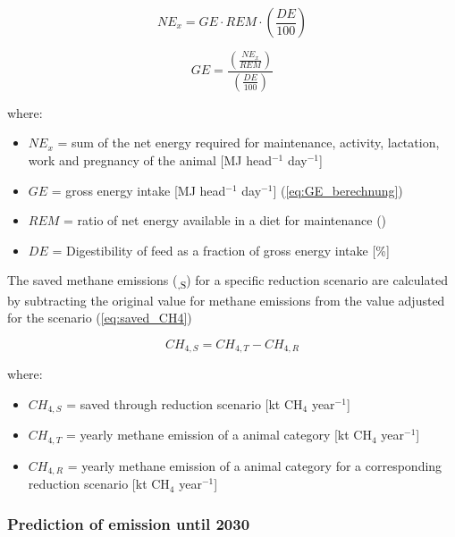 \begin{equation}
	NE_x = GE \cdot REM \cdot \left( \frac{DE}{100}\right)
	\label{eq:NE_x_calc} 
\end{equation}

\begin{equation}
	GE = \frac{\left( \frac{NE_x}{REM}\right) }{\left( \frac{DE}{100}\right)}
	\label{eq:GE_adjusted_calc}
\end{equation}

\noindent where:
\begin{itemize}
	\item $NE_x$ = sum of the net energy required for maintenance, activity, lactation, work and pregnancy of the animal [MJ head$^{-1}$ day$^{-1}$]
	\item $GE$ = gross energy intake [MJ head$^{-1}$ day$^{-1}$] (\cref{eq:GE_berechnung})
	\item $REM$ = ratio of net energy available in a diet for maintenance ()
	\item $DE$ = Digestibility of feed as a fraction of gross energy intake [\%] 
\end{itemize}

\noindent The saved methane emissions (\textsubscript{,S}) for a specific reduction scenario are calculated by subtracting the original value for methane emissions from the value adjusted for the scenario (\cref{eq:saved_CH4})

\begin{equation}
	CH_{4,S} = CH_{4,T} - CH_{4,R}
	\label{eq:saved_CH4}
\end{equation}

\noindent where:
\begin{itemize}
	\item $CH_{4, S}$ = saved  through reduction scenario [kt CH$_4$ year$^{-1}$]
	\item $CH_{4, T}$ = yearly methane emission of a animal category [kt CH$_4$ year$^{-1}$]
	\item $CH_{4, R}$ = yearly methane emission of a animal category for a corresponding reduction scenario [kt CH$_4$ year$^{-1}$]
\end{itemize}

\subsubsection{Prediction of  emission until 2030}
\label{sec:Prediction_CH4_2030}

